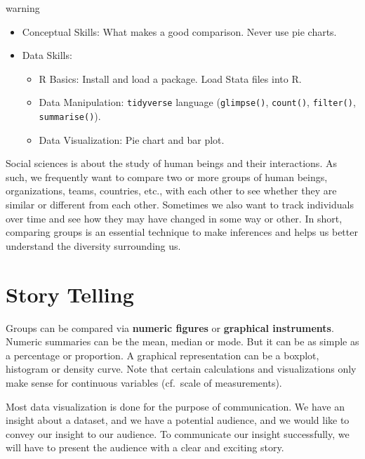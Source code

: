 \documentclass[
]{book}
\providecommand{\tightlist}{%
  \setlength{\itemsep}{0pt}\setlength{\parskip}{0pt}}
\begin{document}
\begin{infobox2}warning

\begin{itemize}
\tightlist
\item
  Conceptual Skills: What makes a good comparison. Never use pie charts.
\item
  Data Skills:

  \begin{itemize}
  \tightlist
  \item
    R Basics: Install and load a package. Load Stata files into R.
  \item
    Data Manipulation: \texttt{tidyverse} language (\texttt{glimpse()}, \texttt{count()}, \texttt{filter()}, \texttt{summarise()}).
  \item
    Data Visualization: Pie chart and bar plot.
  \end{itemize}
\end{itemize}

\end{infobox2}

Social sciences is about the study of human beings and their interactions. As such, we frequently want to compare two or more groups of human beings, organizations, teams, countries, etc., with each other to see whether they are similar or different from each other. Sometimes we also want to track individuals over time and see how they may have changed in some way or other. In short, comparing groups is an essential technique to make inferences and helps us better understand the diversity surrounding us.

\hypertarget{story-telling}{%
\section{Story Telling}\label{story-telling}}

Groups can be compared via \textbf{numeric figures} or \textbf{graphical instruments}. Numeric summaries can be the mean, median or mode. But it can be as simple as a percentage or proportion. A graphical representation can be a boxplot, histogram or density curve. Note that certain calculations and visualizations only make sense for continuous variables (cf.~scale of measurements).

Most data visualization is done for the purpose of communication. We have an insight about a dataset, and we have a potential audience, and we would like to convey our insight to our audience. To communicate our insight successfully, we will have to present the audience with a clear and exciting story.
\end{document}

